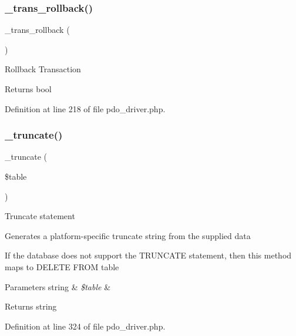 \subsubsection{\texorpdfstring{\_trans\_rollback()}{\_trans\_rollback()}}
{\footnotesize\ttfamily \+\_\+trans\+\_\+rollback (\begin{DoxyParamCaption}{ }\end{DoxyParamCaption})\hspace{0.3cm}{\ttfamily [protected]}}

Rollback Transaction

\begin{DoxyReturn}{Returns}
bool 
\end{DoxyReturn}


Definition at line 218 of file pdo\+\_\+driver.\+php.

\mbox{\label{class_c_i___d_b__pdo__driver_aa029600528fc1ce660a23ff4b4667f95}} 
\subsubsection{\texorpdfstring{\_truncate()}{\_truncate()}}
{\footnotesize\ttfamily \+\_\+truncate (\begin{DoxyParamCaption}\item[{}]{\$table }\end{DoxyParamCaption})\hspace{0.3cm}{\ttfamily [protected]}}

Truncate statement

Generates a platform-\/specific truncate string from the supplied data

If the database does not support the T\+R\+U\+N\+C\+A\+TE statement, then this method maps to \textquotesingle{}D\+E\+L\+E\+TE F\+R\+OM table\textquotesingle{}


\begin{DoxyParams}[1]{Parameters}
string & {\em \$table} & \\
\hline
\end{DoxyParams}
\begin{DoxyReturn}{Returns}
string 
\end{DoxyReturn}


Definition at line 324 of file pdo\+\_\+driver.\+php.

\mbox{\label{class_c_i___d_b__pdo__driver_a77248aaad33eb132c04cc4aa3f4bc8cb}} 

